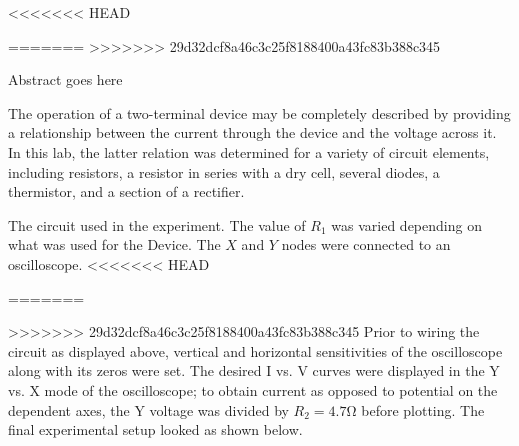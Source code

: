 
<<<<<<< HEAD
\usepackage{tikz}
\usetikzlibrary{optics}
\usepackage{verbatim}

=======
>>>>>>> 29d32dcf8a46c3c25f8188400a43fc83b388c345
\physics

\begin{paperabs}

	Abstract goes here
	
\end{paperabs}

\begin{paper}
	
	
	The operation of a two-terminal device may be completely described by providing a relationship between the current through the device and the voltage across it. In this lab, the latter relation was determined for a variety of circuit elements, including resistors, a resistor in series with a dry cell, several diodes, a thermistor, and a section of a rectifier. 

	{The circuit used in the experiment.
		The value of $R_1$ was varied depending on what was used for the Device.
		The $X$ and $Y$ nodes were connected to an oscilloscope.}
<<<<<<< HEAD
	
=======

>>>>>>> 29d32dcf8a46c3c25f8188400a43fc83b388c345
	Prior to wiring the circuit as displayed above, vertical and horizontal sensitivities of the oscilloscope along with its zeros were set. The desired I vs. V curves were displayed in the Y vs. X mode of the oscilloscope; to obtain current as opposed to potential on the dependent axes, the Y voltage was divided by \( R_2 = 4.7 \si{\ohm} \) before plotting. The final experimental setup looked as shown below.
	

\end{paper}
